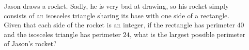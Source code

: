 Jason draws a rocket. Sadly, he is very bad at drawing, so his rocket simply consists of an isosceles triangle sharing its base with one side of a rectangle. Given that each side of the rocket is an integer, if the rectangle has perimeter $40$ and the isosceles triangle has perimeter $24$, what is the largest possible perimeter of Jason's rocket?
